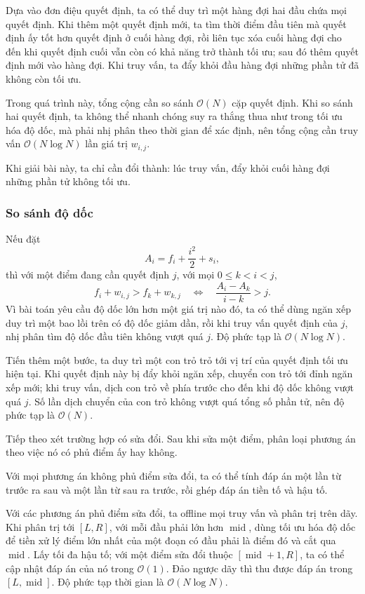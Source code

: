 \documentclass[11pt]{article}
\newcommand{\Oh}{\mathcal{O}}
\begin{document}
Dựa vào đơn điệu quyết định, ta có thể duy trì một hàng đợi hai đầu chứa mọi
quyết định. Khi thêm một quyết định mới, ta tìm thời điểm đầu tiên mà quyết
định ấy tốt hơn quyết định ở cuối hàng đợi, rồi liên tục xóa cuối hàng đợi cho
đến khi quyết định cuối vẫn còn có khả năng trở thành tối ưu; sau đó thêm
quyết định mới vào hàng đợi. Khi truy vấn, ta đẩy khỏi đầu hàng đợi những phần
tử đã không còn tối ưu.

Trong quá trình này, tổng cộng cần so sánh \(\Oh(N)\) cặp quyết định. Khi so
sánh hai quyết định, ta không thể nhanh chóng suy ra thắng thua như trong tối
ưu hóa độ dốc, mà phải nhị phân theo thời gian để xác định, nên tổng cộng cần
truy vấn \(\Oh(N\log N)\) lần giá trị \(w_{i,j}\).

Khi giải bài này, ta chỉ cần đổi thành: lúc truy vấn, đẩy khỏi cuối hàng đợi
những phần tử không tối ưu.

\subsubsection{So sánh độ dốc}

Nếu đặt
\[
  A_i=f_i+\frac{i^2}{2}+s_i,
\]
thì với một điểm đang cần quyết định \(j\), với mọi \(0\le k<i<j\),
\[
  f_i+w_{i,j}>f_k+w_{k,j}
  \quad\Longleftrightarrow\quad
  \frac{A_i-A_k}{i-k}>j.
\]
Vì bài toán yêu cầu độ dốc lớn hơn một giá trị nào đó, ta có thể dùng ngăn xếp
duy trì một bao lồi trên có độ dốc giảm dần, rồi khi truy vấn quyết định của
\(j\), nhị phân tìm độ dốc đầu tiên không vượt quá \(j\). Độ phức tạp là
\(\Oh(N\log N)\).

Tiến thêm một bước, ta duy trì một con trỏ trỏ tới vị trí của quyết định tối
ưu hiện tại. Khi quyết định này bị đẩy khỏi ngăn xếp, chuyển con trỏ tới đỉnh
ngăn xếp mới; khi truy vấn, dịch con trỏ về phía trước cho đến khi độ dốc
không vượt quá \(j\). Số lần dịch chuyển của con trỏ không vượt quá tổng số
phần tử, nên độ phức tạp là \(\Oh(N)\).

Tiếp theo xét trường hợp có sửa đổi. Sau khi sửa một điểm, phân loại phương án
theo việc nó có phủ điểm ấy hay không.

Với mọi phương án không phủ điểm sửa đổi, ta có thể tính đáp án một lần từ
trước ra sau và một lần từ sau ra trước, rồi ghép đáp án tiền tố và hậu tố.

Với các phương án phủ điểm sửa đổi, ta offline mọi truy vấn và phân trị trên
dãy. Khi phân trị tới \([L,R]\), với mỗi đầu phải lớn hơn \(\operatorname{mid}\),
dùng tối ưu hóa độ dốc để tiền xử lý điểm lớn nhất của một đoạn có đầu phải là
điểm đó và cắt qua \(\operatorname{mid}\). Lấy tối đa hậu tố; với một điểm sửa
đổi thuộc \([\operatorname{mid}+1,R]\), ta có thể cập nhật đáp án của nó trong
\(\Oh(1)\). Đảo ngược dãy thì thu được đáp án trong \([L,\operatorname{mid}]\).
Độ phức tạp thời gian là \(\Oh(N\log N)\).
\end{document}
